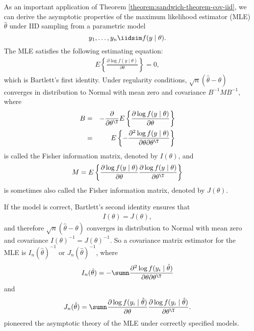 As an important application of Theorem \ref{theorem:sandwich-theorem-cov-iid}, we can derive the asymptotic properties of the maximum likelihood estimator (MLE) $\hat{\theta}$ under \textup{IID} sampling from a parametric model 
$$
 y_1,\ldots, y_n \iidsim  f(y\mid \theta).
 $$
 The MLE satisfies the following estimating equation:
\begin{eqnarray}
E\left\{  \frac{\partial \log f(y\mid \theta)}{ \partial \theta}   \right\} = 0,
\label{eq::bartlett-vector1}
\end{eqnarray}
which is Bartlett's first identity. 
Under regularity conditions, $\sqrt{n} (\hat{\theta} - \theta)$ converges in distribution to Normal with mean zero and covariance $B^{-1} M B^{-1}$, where
\begin{eqnarray*}
B 
&=& - \frac{\partial }{\partial \theta^{\T}} E\left\{  \frac{\partial \log f(y\mid \theta)}{ \partial \theta}   \right\} \\
&=&
E\left\{ -  \frac{\partial^2 \log f(y\mid \theta)}{ \partial \theta  \partial \theta^{\T} }   \right\} 
\end{eqnarray*}
is called the Fisher information matrix, denoted by $I(\theta)$,
and
$$
M = E\left\{  \frac{\partial \log f(y\mid \theta)}{ \partial \theta}  \frac{\partial \log f(y\mid \theta)}{ \partial \theta^{\T}}   \right\}
$$
is sometimes also called the Fisher information matrix, denoted by  $J(\theta)$.


If the model is correct,
Bartlett's second identity ensures that 
\begin{eqnarray}
I(\theta)=J(\theta),
\label{eq::bartlett-vector2}
\end{eqnarray}
and therefore  $\sqrt{n} (\hat{\theta} - \theta)$ converges in distribution to Normal with mean zero and covariance $I(\theta)^{-1} = J(\theta)^{-1}$. So a covariance matrix estimator for the MLE is $I_n(\hat{\theta})^{-1}$ or $J_n(\hat{\theta}) ^{-1}$, where 
$$
I_n(\hat{\theta}) =  - \sumn   \frac{\partial^2 \log f(y_i\mid \hat{\theta} )}{ \partial \theta \partial \theta^{\T} }  
$$   
and
$$
J_n(\hat{\theta}) = \sumn \frac{\partial \log f(y_i \mid \hat{\theta})}{ \partial \theta}  \frac{\partial \log f(y_i \mid \hat{\theta})}{ \partial \theta^{\T}}. 
$$
\citet{fisher1925theory} pioneered the asymptotic theory of the MLE under correctly specified models. 


